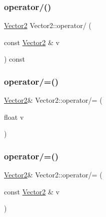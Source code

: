 \mbox{\label{class_vector2_ad7e0fa2a2380e803d261f4b8318bc51b}} 
\subsubsection{\texorpdfstring{operator/()}{operator/()}\hspace{0.1cm}{\footnotesize\ttfamily [2/2]}}
{\footnotesize\ttfamily \mbox{\hyperlink{class_vector2}{Vector2}} Vector2\+::operator/ (\begin{DoxyParamCaption}\item[{const \mbox{\hyperlink{class_vector2}{Vector2}} \&}]{v }\end{DoxyParamCaption}) const\hspace{0.3cm}{\ttfamily [inline]}}

\mbox{\label{class_vector2_acd7f67b67480f1c327286775dfa66f3b}} 
\subsubsection{\texorpdfstring{operator/=()}{operator/=()}\hspace{0.1cm}{\footnotesize\ttfamily [1/2]}}
{\footnotesize\ttfamily \mbox{\hyperlink{class_vector2}{Vector2}}\& Vector2\+::operator/= (\begin{DoxyParamCaption}\item[{float}]{v }\end{DoxyParamCaption})\hspace{0.3cm}{\ttfamily [inline]}}

\mbox{\label{class_vector2_a896f18bec4800bb784c2aacf052ae67e}} 
\subsubsection{\texorpdfstring{operator/=()}{operator/=()}\hspace{0.1cm}{\footnotesize\ttfamily [2/2]}}
{\footnotesize\ttfamily \mbox{\hyperlink{class_vector2}{Vector2}}\& Vector2\+::operator/= (\begin{DoxyParamCaption}\item[{const \mbox{\hyperlink{class_vector2}{Vector2}} \&}]{v }\end{DoxyParamCaption})\hspace{0.3cm}{\ttfamily [inline]}}

